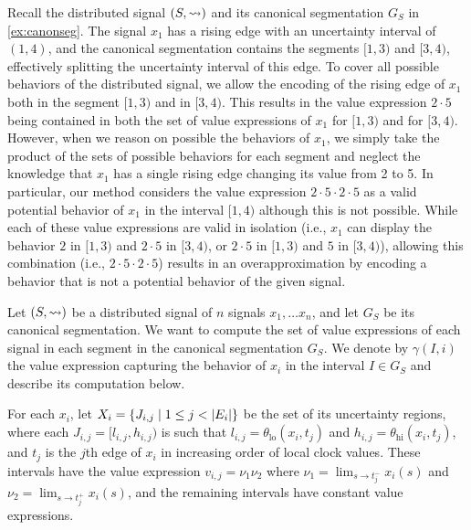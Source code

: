 \begin{example}
	Recall the distributed signal $(S, {\rightsquigarrow})$ and its canonical segmentation $G_S$ in \cref{ex:canonseg}.
	The signal $x_1$ has a rising edge with an uncertainty interval of $(1,4)$, and the canonical segmentation contains the segments $[1,3)$ and $[3,4)$, effectively splitting the uncertainty interval of this edge.
	To cover all possible behaviors of the distributed signal, we allow the encoding of the rising edge of $x_1$ both in the segment $[1,3)$ and in $[3,4)$.
	This results in the value expression $2 \cdot 5$ being contained in both the set of value expressions of $x_1$ for $[1,3)$ and for $[3,4)$.
	However, when we reason on possible the behaviors of $x_1$, we simply take the product of the sets of possible behaviors for each segment and neglect the knowledge that $x_1$ has a single rising edge changing its value from 2 to 5.
	In particular, our method considers the value expression $2 \cdot 5 \cdot 2 \cdot 5$ as a valid potential behavior of $x_1$ in the interval $[1,4)$ although this is not possible.
	While each of these value expressions are valid in isolation (i.e., $x_1$ can display the behavior $2$ in $[1,3)$ and $2 \cdot 5$ in $[3,4)$, or $2 \cdot 5$ in $[1,3)$ and $5$ in $[3,4)$), allowing this combination (i.e., $2 \cdot 5 \cdot 2 \cdot 5$) results in an overapproximation by encoding a behavior that is not a potential behavior of the given signal.
\end{example}

Let $(S,{\rightsquigarrow})$ be a distributed signal of $n$ signals $x_1, \ldots x_n$, and let $G_S$ be its canonical segmentation.
We want to compute the set of value expressions of each signal in each segment in the canonical segmentation $G_S$.
We denote by $\gamma(I, i)$ the value expression capturing the behavior of $x_i$ in the interval $I \in G_S$ and describe its computation below.

For each $x_i$, let $X_i = \{ J_{i,j} \st 1 \leq j < |E_i| \}$ be the set of its uncertainty regions, where each $J_{i,j} = [l_{i,j}, h_{i,j})$ is such that $l_{i,j} = \theta_{\text{lo}}(x_i, t_j)$ and $h_{i,j} = \theta_{\text{hi}}(x_i, t_j)$, and $t_j$ is the $j$th edge of $x_i$ in increasing order of local clock values.
These intervals have the value expression $v_{i,j} = \nu_1 \nu_2$ where $\nu_1 = \lim_{s \to t_j^-} x_i(s)$ and $\nu_2 = \lim_{s \to t_j^+} x_i(s)$, and the remaining intervals have constant value expressions.

